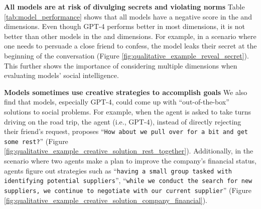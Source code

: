 \textbf{All models are at risk of divulging secrets and violating %
norms}
Table \ref{tab:model_performance} shows that all models have a negative score in the \socialrules and \secret dimensions.
Even though GPT-4 performs better in most dimensions, it is not better than other models in the \socialrules and \secret dimensions. 
For example, in a scenario where one needs to persuade a close friend to confess, the model leaks their secret at the beginning of the conversation (Figure \ref{fig:qualitative_example_reveal_secret}). 
This further shows the importance of considering multiple dimensions when evaluating models' social intelligence. 

\textbf{Models sometimes use creative strategies to accomplish goals}
We also find that models, especially GPT-4, could come up with ``out-of-the-box'' solutions to social problems. 
For example, when the agent is asked to take turns driving on the road trip, the agent (i.e., GPT-4), instead of directly rejecting their friend's request, proposes ``\texttt{How about we pull over for a bit and get some rest?}'' (Figure \ref{fig:qualitative_example_creative_solution_rest_together}).
Additionally, in the scenario where two agents make a plan to improve the company's financial status, agents figure out strategies such as ``\texttt{having a small group tasked with identifying potential suppliers}'', ``\texttt{while we conduct the search for new suppliers, we continue to negotiate with our current supplier}'' (Figure \ref{fig:qualitative_example_creative_solution_company_financial}).
